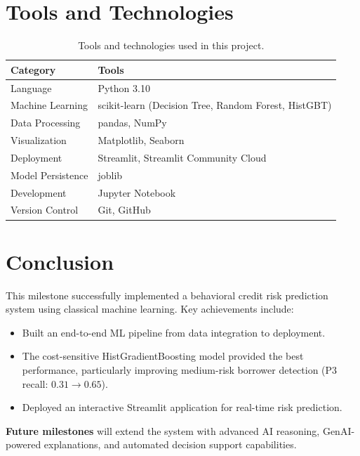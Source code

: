 \documentclass[12pt,a4paper]{article}
\begin{document}
\section{Tools and Technologies}

\begin{table}[h!]
    \centering
    \begin{tabular}{@{} l l @{}}
        \toprule
        \textbf{Category} & \textbf{Tools} \\
        \midrule
        Language           & Python 3.10 \\
        Machine Learning   & scikit-learn (Decision Tree, Random Forest, HistGBT) \\
        Data Processing    & pandas, NumPy \\
        Visualization      & Matplotlib, Seaborn \\
        Deployment         & Streamlit, Streamlit Community Cloud \\
        Model Persistence  & joblib \\
        Development        & Jupyter Notebook \\
        Version Control    & Git, GitHub \\
        \bottomrule
    \end{tabular}
    \caption{Tools and technologies used in this project.}
    \label{tab:tools}
\end{table}

\section{Conclusion}

This milestone successfully implemented a behavioral credit risk prediction system using classical machine learning. Key achievements include:

\begin{itemize}[nosep]
    \item Built an end-to-end ML pipeline from data integration to deployment.
    \item The cost-sensitive HistGradientBoosting model provided the best performance, particularly improving medium-risk borrower detection (P3 recall: $0.31 \rightarrow 0.65$).
    \item Deployed an interactive Streamlit application for real-time risk prediction.
\end{itemize}

\noindent \textbf{Future milestones} will extend the system with advanced AI reasoning, GenAI-powered explanations, and automated decision support capabilities.

\end{document}
